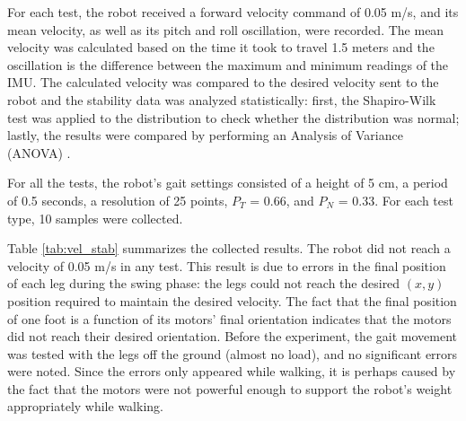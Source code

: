 \documentclass[conference]{IEEEtran}
\begin{document}
For each test, the robot received a forward velocity command of 0.05 m/s, and its mean velocity, as well as its pitch and roll oscillation, were recorded. The mean velocity was calculated based on the time it took to travel 1.5 meters and the oscillation is the difference between the maximum and minimum readings of the IMU. The calculated velocity was compared to the desired velocity sent to the robot and the stability data was analyzed statistically: first, the Shapiro-Wilk test \cite{leotti2005comparaccao} was applied to the distribution to check whether the distribution was normal; lastly, the results were compared by performing an Analysis of Variance (ANOVA) \cite{cano2012six}.

For all the tests, the robot's gait settings consisted of a height of 5 cm, a period of 0.5 seconds, a resolution of 25 points, $P_T$ = 0.66, and $P_N$ = 0.33. For each test type, 10 samples were collected.

Table \ref{tab:vel_stab} summarizes the collected results. The robot did not reach a velocity of 0.05 m/s in any test. This result is due to errors in the final position of each leg during the swing phase: the legs could not reach the desired $(x,y)$ position required to maintain the desired velocity. The fact that the final position of one foot is a function of its motors' final orientation indicates that the motors did not reach their desired orientation. Before the experiment, the gait movement was tested with the legs off the ground (almost no load), and no significant errors were noted. Since the errors only appeared while walking, it is perhaps caused by the fact that the motors were not powerful enough to support the robot's weight appropriately while walking.
\end{document}
